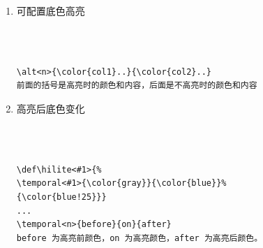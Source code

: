 \begin{enumerate}
  \item \textcolor[rgb]{1.00,0.00,0.00}{可配置底色高亮}\\~\\


  \\
\begin{shaded}
\begin{Verbatim}
\alt<n>{\color{col1}..}{\color{col2}..}
前面的括号是高亮时的颜色和内容，后面是不高亮时的颜色和内容
\end{Verbatim}
\end{shaded}

  \item \textcolor[rgb]{1.00,0.00,0.00}{高亮后底色变化}\\~\\


  \\
\begin{shaded}
\begin{Verbatim}
\def\hilite<#1>{%
\temporal<#1>{\color{gray}}{\color{blue}}%
{\color{blue!25}}}
...
\temporal<n>{before}{on}{after}
before 为高亮前颜色，on 为高亮颜色，after 为高亮后颜色。

\end{Verbatim}
\end{shaded}
\end{enumerate}



